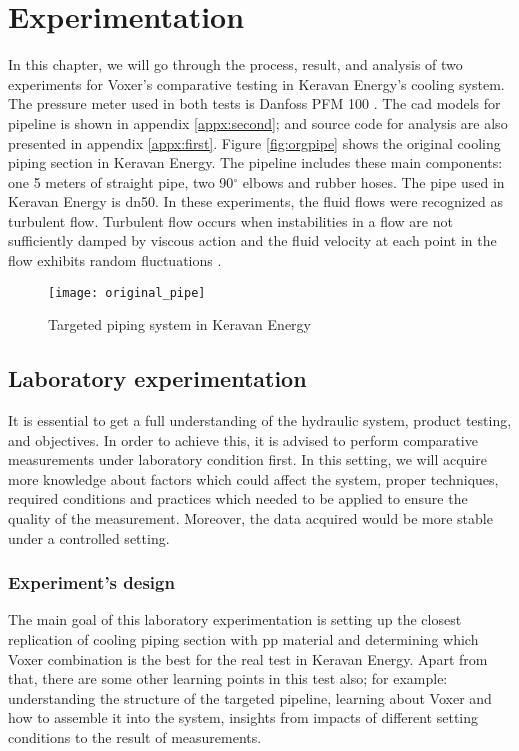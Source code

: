 
\chapter{Experimentation}

In this chapter, we will go through the process, result, and analysis of two experiments for Voxer's comparative testing in Keravan Energy's cooling system. The pressure meter used in both tests is Danfoss PFM 100 \cite{danfoss:web}. The \gls{cad} models for pipeline is shown in appendix \ref{appx:second}; and source code for analysis are also presented in appendix \ref{appx:first}. Figure \vref{fig:orgpipe} shows the original cooling piping section in Keravan Energy. The pipeline includes these main components: one 5 meters of straight pipe, two 90$^{\circ}$ elbows and rubber hoses. The pipe used in Keravan Energy is \gls{dn}50. In these experiments, the fluid flows were recognized as turbulent flow. Turbulent flow occurs when instabilities in a flow are not sufficiently damped by viscous action and the fluid velocity at each point in the flow exhibits random fluctuations \cite{turbulent:article}.

\begin{figure}[h]
  \centering
  \texttt{[image: original\_pipe]}
  \caption{ Targeted piping system in Keravan Energy}
  \label{fig:orgpipe}
\end{figure}

\section{Laboratory experimentation}

It is essential to get a full understanding of the hydraulic system, product testing, and objectives. In order to achieve this, it is advised to perform comparative measurements under laboratory condition first. In this setting, we will acquire more knowledge about factors which could affect the system, proper techniques, required conditions and practices which needed to be applied to ensure the quality of the measurement. Moreover, the data acquired would be more stable under a controlled setting.

\subsection{Experiment's design}

The main goal of this laboratory experimentation is setting up the closest replication of cooling piping section with \gls{pp} material and determining which Voxer combination is the best for the real test in Keravan Energy. Apart from that, there are some other learning points in this test also; for example: understanding the structure of the targeted pipeline, learning about Voxer and how to assemble it into the system, insights from impacts of different setting conditions to the result of measurements.

